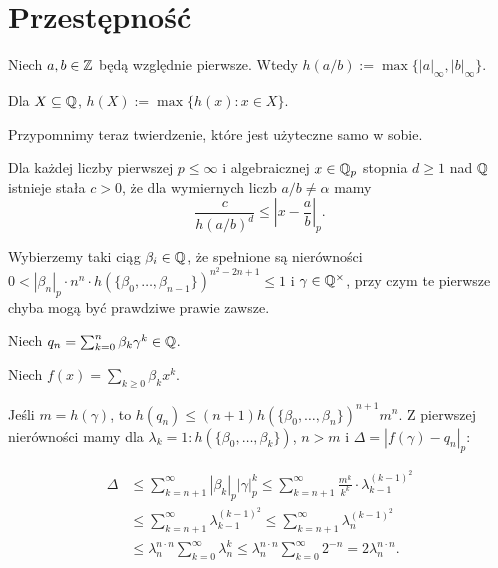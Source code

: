 \section{Przestępność}
\begin{definicja}[lokalna]
	Niech $a, b \in \mathbb Z$ będą względnie pierwsze.
	Wtedy $h(a/b) := \max \{|a|_\infty, |b|_\infty\}$.
\end{definicja}

\begin{definicja}
	Dla $X \subseteq \mathbb Q$, $h(X) := \max\{h(x) : x \in X\}$.
\end{definicja}

Przypomnimy teraz twierdzenie, które jest użyteczne samo w sobie.

\begin{twierdzenie}[Liouville'a]
	Dla każdej liczby pierwszej $p \le \infty$ i algebraicznej $x \in \mathbb Q_p$ stopnia $d \ge 1$ nad $\mathbb Q$ istnieje stała $c > 0$, że dla wymiernych liczb $a / b \neq \alpha$ mamy
	\[
		\frac{c}{h(a/b)^d} \le \left|x - \frac ab \right|_p.
	\]
\end{twierdzenie}

Wybierzemy taki ciąg $\beta_i \in \mathbb Q$, że spełnione są nierówności $0 < |\beta_n|_p \cdot n^n \cdot h(\{\beta_0, \ldots, \beta_{n-1}\})^{n^2-2n+1} \le 1$ i $\gamma \in \mathbb Q^\times$, przy czym te pierwsze chyba mogą być prawdziwe prawie zawsze.

\begin{definicja}
	Niech $q_n = \sum_{k = 0}^n \beta_k \gamma^k \in \mathbb Q$.
\end{definicja}

\begin{definicja}
	Niech $f(x) = \sum_{k \ge 0} \beta_k x^k$.
\end{definicja}

Jeśli $m = h(\gamma)$, to $h(q_n) \le (n+1) h(\{\beta_0, \ldots, \beta_n\})^{n+1} m^n$.
Z pierwszej nierówności mamy dla $\lambda_k = 1 : h(\{\beta_0, \ldots, \beta_{k}\})$, $n > m$ i $\Delta = |f(\gamma) - q_n|_p$:

\begin{align*}
	\Delta & \le \sum_{k = n+1}^\infty |\beta_k|_p |\gamma|_p^k \le \sum_{k = n+1}^\infty \frac{m^k}{k^k} \cdot \lambda_{k-1}^{(k-1)^2} \\
	& \le \sum_{k = n+1}^\infty \lambda_{k-1}^{(k-1)^2} \le \sum_{k=n+1}^\infty \lambda_n^{(k-1)^2} \\ %
	& \le \lambda_n^{n \cdot n} \sum_{k = 0}^\infty \lambda_n^k \le \lambda_n^{n \cdot n} \sum_{k = 0}^\infty 2^{-n} = 2 \lambda_n^{n \cdot n}.
\end{align*}

